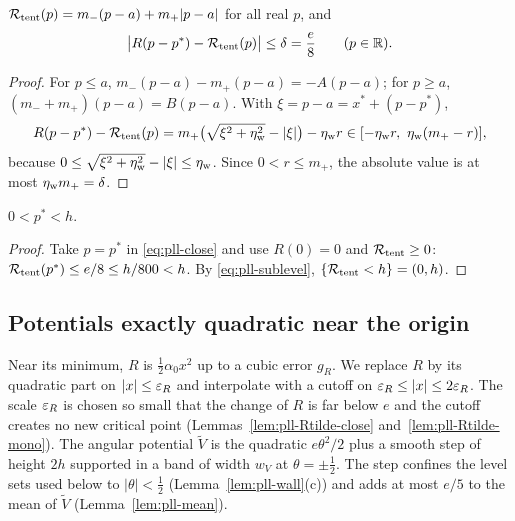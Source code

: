 \begin{lemma}\label{lem:pll-close}
$\mathcal{R}_{\rm tent}(p)=m_-(p-a)+m_+|p-a|$ for all real $p$, and
\begin{equation}\label{eq:pll-close}
 \bigl|R(p-p^*)-\mathcal{R}_{\rm tent}(p)\bigr|\le\delta=\frac e8\qquad(p\in\mathbb{R}).
\end{equation}
\end{lemma}

\begin{proof}
For $p\le a$, $m_-(p-a)-m_+(p-a)=-A(p-a)$; for $p\ge a$, $(m_-+m_+)(p-a)=B(p-a)$. With
$\xi=p-a=x^*+(p-p^*)$,
\[
 R(p-p^*)-\mathcal{R}_{\rm tent}(p)=m_+\bigl(\sqrt{\xi^2+\eta_{\rm w}^2}-|\xi|\bigr)-\eta_{\rm w} r\in[-\eta_{\rm w} r,\ \eta_{\rm w}(m_+-r)],
\]
because $0\le\sqrt{\xi^2+\eta_{\rm w}^2}-|\xi|\le\eta_{\rm w}$. Since $0<r\le m_+$, the absolute value is at most
$\eta_{\rm w} m_+=\delta$.
\end{proof}

\begin{lemma}\label{lem:pll-pstar}
$0<p^*<h$.
\end{lemma}

\begin{proof}
Take $p=p^*$ in \eqref{eq:pll-close} and use $R(0)=0$ and $\mathcal{R}_{\rm tent}\ge0$:
$\mathcal{R}_{\rm tent}(p^*)\le e/8\le h/800<h$. By \eqref{eq:pll-sublevel}, $\{\mathcal{R}_{\rm tent}<h\}=(0,h)$.
\end{proof}

\subsection{Potentials exactly quadratic near the origin}\label{sec:pll-morse}

Near its minimum, $R$ is $\frac12\alpha_0x^2$ up to a cubic error $g_R$. We replace $R$ by its quadratic part on
$|x|\le\varepsilon_R$ and interpolate with a cutoff on $\varepsilon_R\le|x|\le2\varepsilon_R$. The scale $\varepsilon_R$ is chosen so small that
the change of $R$ is far below $e$ and the cutoff creates no new critical point (Lemmas~\ref{lem:pll-Rtilde-close}
and~\ref{lem:pll-Rtilde-mono}). The angular potential $\tilde V$ is the quadratic $e\theta^2/2$ plus a smooth step of
height $2h$ supported in a band of width $w_V$ at $\theta=\pm\frac12$. The step confines the level sets used below to
$|\theta|<\frac12$ (Lemma~\ref{lem:pll-wall}(c)) and adds at most $e/5$ to the mean of $\tilde V$
(Lemma~\ref{lem:pll-mean}).

